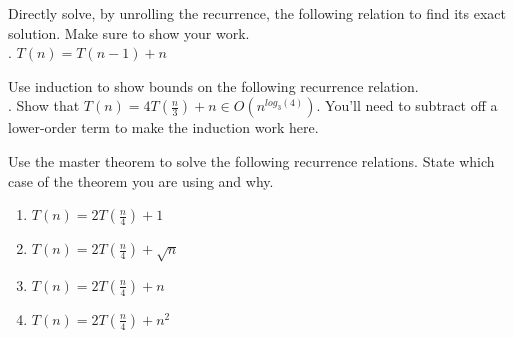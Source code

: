 \documentclass[12pt]{article}
\begin{document}
\begin{flushleft}











\newpage
\noindent Directly solve, by unrolling the recurrence, the following relation to find its exact solution. Make sure to show your work.\\
. $T(n)=T(n-1)+n$ \\
\medskip
\noindent\hrulefill
\bigskip











\newpage
\noindent Use induction to show bounds on the following recurrence relation.\\
. Show that $T (n) = 4T(\frac{n}{3}) + n \in O(n^{log_3(4)})$. You’ll need to subtract off a lower-order term to make the induction work here.\\
\medskip
\noindent\hrulefill
\bigskip










\newpage
 \noindent Use the master theorem to solve the following recurrence relations. State which case of the
theorem you are using and why.
\begin{enumerate}\addtocounter{enumi}{3}
    \item $T (n) = 2T (\frac{n}{4} ) + 1$
    \item $T (n) = 2T (\frac{n}{4} ) + \sqrt{n}$
    \item $T (n) = 2T (\frac{n}{4} ) + n$
    \item $T (n) = 2T (\frac{n}{4} ) + n^2$
\end{enumerate}
\noindent\hrulefill
\bigskip











\end{flushleft}
\end{document}
